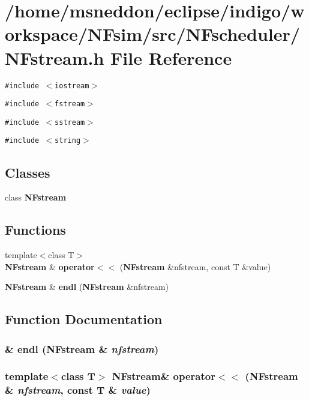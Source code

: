 \section{/home/msneddon/eclipse/indigo/workspace/NFsim/src/NFscheduler/NFstream.h File Reference}
\label{NFstream_8h}


{\tt \#include $<$iostream$>$}\par
{\tt \#include $<$fstream$>$}\par
{\tt \#include $<$sstream$>$}\par
{\tt \#include $<$string$>$}\par
\subsection*{Classes}
\begin{CompactItemize}
\item 
class {\bf NFstream}
\end{CompactItemize}
\subsection*{Functions}
\begin{CompactItemize}
\item 
{\footnotesize template$<$class T$>$ }\\{\bf NFstream} \& {\bf operator$<$$<$} ({\bf NFstream} \&nfstream, const T \&value)
\item 
{\bf NFstream} \& {\bf endl} ({\bf NFstream} \&nfstream)
\end{CompactItemize}


\subsection{Function Documentation}
\subsubsection{\& endl ({\bf NFstream} \& {\em nfstream})}\label{NFstream_8h_70d95b404a0185199948bf778584bdc3}


\subsubsection{\setlength{\rightskip}{0pt plus 5cm}template$<$class T$>$ {\bf NFstream}\& operator$<$$<$ ({\bf NFstream} \& {\em nfstream}, const T \& {\em value})\hspace{0.3cm}{\tt  [inline]}}\label{NFstream_8h_ef588953052314e1b69285568a59947f}


